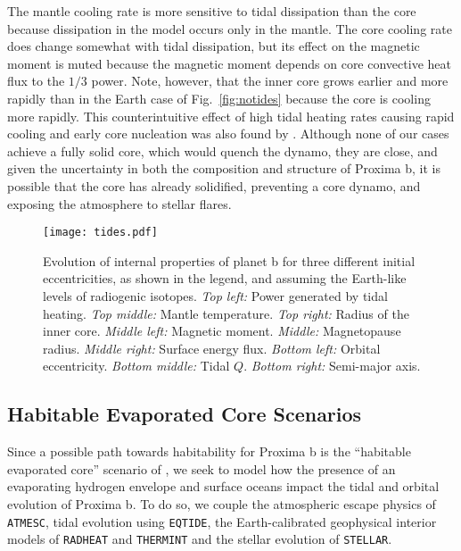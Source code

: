 \documentclass[preprint,12pt]{aastex}
\def\atmesc{\texttt{\footnotesize{ATMESC}}\xspace}
\def\eqtide{\texttt{\footnotesize{EQTIDE}}\xspace}
\def\radheat{\texttt{\footnotesize{RADHEAT}}\xspace}
\def\thermint{\texttt{\footnotesize{THERMINT}}\xspace}
\def\stellar{\texttt{\footnotesize{STELLAR}}\xspace}
\begin{document}
The mantle cooling rate is more sensitive to tidal dissipation than the core because dissipation 
in the model occurs only in the mantle.  The core cooling rate does change somewhat with tidal 
dissipation, but its effect on the magnetic moment is muted because the magnetic moment depends 
on core convective heat flux to the $1/3$ power.
 Note, however, that
the inner core grows earlier and more rapidly than in the
Earth case of Fig.~\ref{fig:notides} because the core is cooling more
rapidly. 
This counterintuitive effect of high tidal heating rates causing rapid cooling and
early core nucleation was also found by \cite{DriscollBarnes15}.
Although none of our cases achieve a fully
solid core, which would quench the dynamo, they are close, and given
the uncertainty in both the composition and structure of Proxima b, 
it is possible that the
core has already solidified, preventing a core dynamo, and exposing the atmosphere to
stellar flares.

\begin{figure} 
\begin{center}
\texttt{[image: tides.pdf]}
\end{center}
\caption{Evolution of internal properties of planet b for three
  different initial eccentricities, as shown in the legend, and
  assuming the Earth-like levels of radiogenic isotopes. {\it Top
    left:} Power generated by tidal heating. {\it Top middle:} Mantle
  temperature. {\it Top right:} Radius of the inner core. {\it Middle
    left:} Magnetic moment. {\it Middle:} Magnetopause radius. {\it
    Middle right:} Surface energy flux. {\it Bottom left:} Orbital
  eccentricity. {\it Bottom middle:} Tidal $Q$. {\it Bottom right:}
  Semi-major axis.}
\label{fig:tides}
\end{figure}

\subsection{Habitable Evaporated Core Scenarios}

Since a possible path towards habitability for Proxima b is the
``habitable evaporated core'' scenario of \citet{Luger15}, we seek to
model how the presence of an evaporating hydrogen envelope and surface
oceans impact the tidal and orbital evolution of Proxima b.  To do so,
we couple the atmospheric escape physics of \atmesc, tidal evolution
using \eqtide, the Earth-calibrated geophysical interior models of
\radheat and \thermint and the stellar evolution of \stellar.
\end{document}
